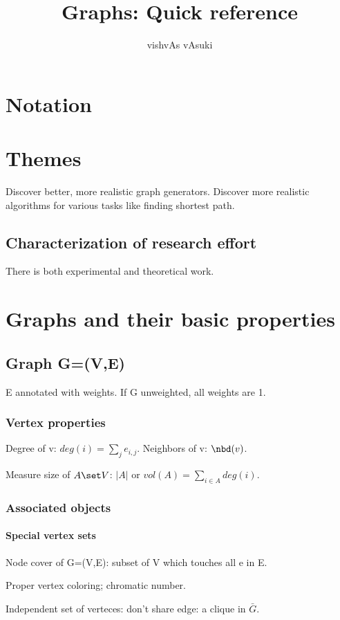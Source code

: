 \documentclass[oneside, article]{memoir}
\title{Graphs: Quick reference}
\author{vishvAs vAsuki}
\begin{document}
\maketitle
\tableofcontents

\part{Notation}

\part{Themes}
Discover better, more realistic graph generators. Discover more realistic algorithms for various tasks like finding shortest path.

\chapter{Characterization of research effort}
There is both experimental and theoretical work.

\part{Graphs and their basic properties}
\chapter{Graph G=(V,E)}
E annotated with weights. If G unweighted, all weights are 1.

\section{Vertex properties}
Degree of v: $deg(i) = \sum_{j} e_{i,j}$. Neighbors of v: $\nbd(v)$.

Measure size of $A \set V$: $|A|$ or $vol(A) = \sum_{i \in A} deg(i)$.

\section{Associated objects}
\subsection{Special vertex sets}
Node cover of G=(V,E): subset of V which touches all e in E. 

Proper vertex coloring; chromatic number.

Independent set of verteces: don't share edge: a clique in $\bar{G}$.
\end{document}
